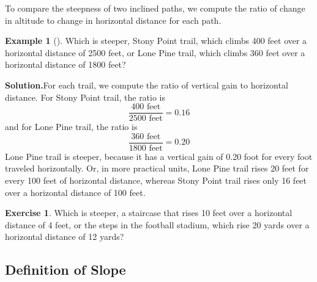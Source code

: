 \documentclass[10pt,]{book}
\theoremstyle{plain}
\theoremstyle{definition}
\theoremstyle{definition}
\newtheorem{example}[theorem]{Example}
\theoremstyle{definition}
\theoremstyle{definition}
\newtheorem{exercise}[theorem]{Exercise}
\numberwithin{equation}{section}
\begin{document}
\par
To compare the steepness of two inclined paths, we compute the ratio of change in
altitude to change in horizontal distance for each path.%
\begin{example}[]\label{example-steep-trail}
Which is steeper, Stony Point trail, which climbs 400 feet over a horizontal distance of 2500 feet, or Lone Pine trail, which climbs 360 feet over a horizontal distance of 1800 feet?%
\par\medskip\noindent%
\textbf{Solution.}\quad For each trail, we compute the ratio of vertical gain to horizontal distance. For Stony Point trail, the ratio is
    \begin{equation*}\frac{400 \text{ feet}}{2500 \text{ feet}}= 0.16 \end{equation*}  
    and for Lone Pine trail, the ratio is
    \begin{equation*}\frac{360 \text{ feet}}{1800 \text{ feet}}= 0.20 \end{equation*} 
    Lone Pine trail is steeper, because it has a vertical gain of 0.20 foot for every foot traveled horizontally. Or, in more practical units, Lone Pine trail rises 20 feet for every 100 feet of horizontal distance, whereas Stony Point trail rises only 16 feet over a horizontal distance of 100 feet.%
\end{example}
\begin{exercise}\label{exercise-steep-steps}
Which is steeper, a staircase that rises 10 feet over a horizontal distance of 4 feet, or the steps in the football stadium, which rise 20 yards over a horizontal distance of 12 yards?\end{exercise}
\typeout{************************************************}
\typeout{************************************************}
\subsection[Definition of Slope]{Definition of Slope}\label{subsection-19}
\end{document}
